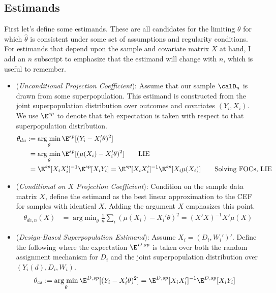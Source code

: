 \documentclass[12pt]{article}
\theoremstyle{plain}
\theoremstyle{definition}
\theoremstyle{remark}
\DeclareMathOperator*{\argmin}{arg\;min}
\begin{document}
\subsection{Estimands}
First let's define some estimands.
These are all candidates for the limiting $\theta$ for which
$\hat{\theta}$ is consistent under some set of assumptions and
regularity conditions.
For estimands that depend upon the sample and covariate matrix $X$ at
hand, I add an $n$ subscript to emphasize that the estimand will change
with $n$, which is useful to remember.
\begin{itemize}
  \item (\emph{Unconditional Projection Coefficient}):
    Assume that our sample $\calD_n$ is drawn from some superpopulation.
    This estimand is constructed from the joint superpopulation
    distribution over outcomes and covariates $(Y_i,X_i)$.
    We use $\E^{sp}$ to denote that teh expectation is taken with
    respect to that superpopulation distribution.
    \begin{align*}
      \theta_{du}
      &:=
      \argmin_{\theta}
      \E^{sp}[(Y_i-X_i'\theta)^2]
      \\
      &\hphantom{:}=
      \argmin_{\theta}
      \E^{sp}[(\mu(X_i)-X_i'\theta)^2]
      \qquad
      \text{LIE}
      \\
      &\hphantom{:}=
      \E^{sp}[X_iX_i']^{-1}
      \E^{sp}[X_iY_i]
      =
      \E^{sp}[X_iX_i']^{-1}
      \E^{sp}[X_i\mu(X_i)]
      \qquad
      \text{Solving FOCs, LIE}
    \end{align*}

  \item
    (\emph{Conditional on $X$ Projection Coefficient}):
    Condition on the sample data matrix $X$, define the estimand as the
    best linear approximation to the CEF for samples with identical $X$.
    Adding the argument $X$ emphasizes this point.
    \begin{align*}
      \theta_{dc,n}(X)
      &=
      \argmin_{\theta}
      \frac{1}{n}
      \sum_i
      (\mu(X_i)-X_i'\theta)^2
      =
      (X'X)^{-1}X'\mu(X)
    \end{align*}


  \item
    (\emph{Design-Based Superpopulation Estimand}):
    Assume $X_i=(D_i,W_i')'$.
    Define the following where the expectation $\E^{D,sp}$ is taken over
    both the random assignment mechanism for $D_i$ and the joint
    superpopulation distribution over
    $(Y_i(d),D_i,W_i)$.
    \begin{align*}
      \theta_{cs}
      &:=
      \argmin_{\theta}
      \E^{D,sp}[(Y_i-X_i'\theta)^2]
      =
      \E^{D,sp}[X_iX_i']^{-1}
      \E^{D,sp}[X_iY_i]
    \end{align*}


\end{itemize}
\end{document}
